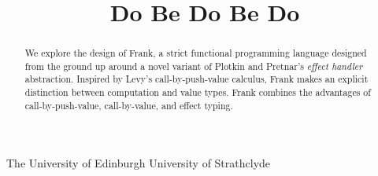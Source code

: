 \documentclass[preprint]{sigplanconf}
\begin{document}


\title{Do Be Do Be Do}

           {The University of Edinburgh}
           {}
           {University of Strathclyde}
           {}

\maketitle



\begin{abstract}
We explore the design of Frank, a strict functional programming
language designed from the ground up around a novel variant of Plotkin
and Pretnar's \emph{effect handler} abstraction.
%
Inspired by Levy's call-by-push-value calculus, Frank makes an
explicit distinction between computation and value types. Frank
combines the advantages of call-by-push-value, call-by-value, and
effect typing.

\end{abstract}
\end{document}
